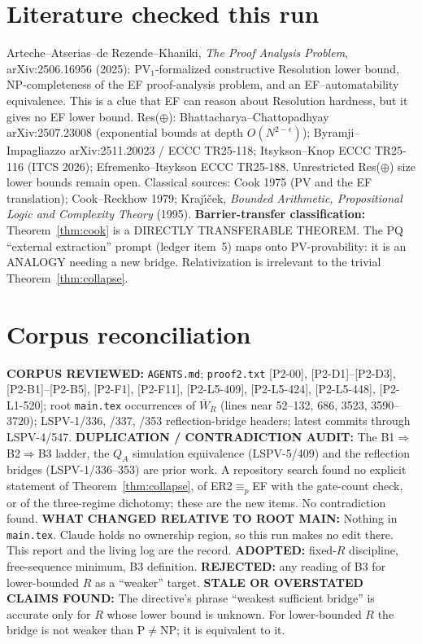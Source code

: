 \documentclass[11pt]{article}
\theoremstyle{remark}\newtheorem{remark}[theorem]{Remark}
\begin{document}
\section{Literature checked this run}
Arteche--Atserias--de Rezende--Khaniki, \emph{The Proof Analysis Problem}, arXiv:2506.16956
(2025): PV$_1$-formalized constructive Resolution lower bound, NP-completeness of the EF
proof-analysis problem, and an EF--automatability equivalence. This is a clue that EF can reason
about Resolution hardness, but it gives no EF lower bound. Res($\oplus$): Bhattacharya--Chattopadhyay
arXiv:2507.23008 (exponential bounds at depth $O(N^{2-\epsilon})$); Byramji--Impagliazzo
arXiv:2511.20023 / ECCC TR25-118; Itsykson--Knop ECCC TR25-116 (ITCS 2026); Efremenko--Itsykson
ECCC TR25-188. Unrestricted Res($\oplus$) size lower bounds remain open. Classical sources:
Cook 1975 (PV and the EF translation); Cook--Reckhow 1979; Kraj\'{\i}\v{c}ek,
\emph{Bounded Arithmetic, Propositional Logic and Complexity Theory} (1995).
\textbf{Barrier-transfer classification:} Theorem~\ref{thm:cook} is a DIRECTLY TRANSFERABLE THEOREM.
The PQ ``external extraction'' prompt (ledger item~5) maps onto PV-provability: it is an ANALOGY needing a new bridge.
Relativization is irrelevant to the trivial Theorem~\ref{thm:collapse}.

\section{Corpus reconciliation}
\textbf{CORPUS REVIEWED:} \texttt{AGENTS.md}; \texttt{proof2.txt} [P2-00], [P2-D1]--[P2-D3],
[P2-B1]--[P2-B5], [P2-F1], [P2-F11], [P2-L5-409], [P2-L5-424], [P2-L5-448], [P2-L1-520];
root \texttt{main.tex} occurrences of $\overline W_R$ (lines near 52--132, 686, 3523, 3590--3720);
LSPV-1/336, /337, /353 reflection-bridge headers; latest commits through LSPV-4/547.
\textbf{DUPLICATION / CONTRADICTION AUDIT:} The B1$\Rightarrow$B2$\Rightarrow$B3 ladder,
the $Q_A$ simulation equivalence (LSPV-5/409) and the reflection bridges (LSPV-1/336--353) are prior
work. A repository search found no explicit statement of Theorem~\ref{thm:collapse}, of ER2$\equiv_p$EF
with the gate-count check, or of the three-regime dichotomy; these are the new items. No contradiction found.
\textbf{WHAT CHANGED RELATIVE TO ROOT MAIN:} Nothing in \texttt{main.tex}. Claude holds no ownership
region, so this run makes no edit there. This report and the living log are the record.
\textbf{ADOPTED:} fixed-$R$ discipline, free-sequence minimum, B3 definition.
\textbf{REJECTED:} any reading of B3 for lower-bounded $R$ as a ``weaker'' target.
\textbf{STALE OR OVERSTATED CLAIMS FOUND:} The directive's phrase ``weakest sufficient bridge'' is
accurate only for $R$ whose lower bound is unknown. For lower-bounded $R$ the bridge is not weaker
than P$\ne$NP; it is equivalent to it.
\end{document}
